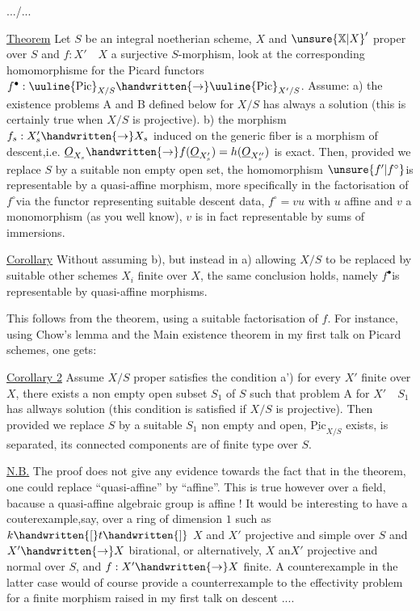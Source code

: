 \hfill .../...\par

\uline{Theorem} Let $S$ be an integral noetherian scheme, $X$ and $\unsure{\mathbb{X}|X}'$ proper over $S$ and $f:X'\quad X$ a surjective $S$-morphism, look at the corresponding homomorphisme for the Picard functors $f^{\bullet}:\text{\uuline{Pic}}_{X/S}\handwritten{\to}\text{\uuline{Pic}}_{X'/S}$. Assume: a) the existence problems A and B defined below for $X/S$ has always a solution (this is certainly true when $X/S$ is projective). b) the morphism $f_{s}:X'_{s}\handwritten{\to}X_{s}$ induced on the generic fiber is a morphism of descent,i.e. $\underline{O}_{X_{s}}\handwritten{\to}f(\underline{O}_{X'_{s}})=h(\underline{O}_{X''_{s}})$ is exact. Then, provided we replace $S$ by a suitable non empty open set, the homomorphism $\unsure{f'|f^{\circ}}$is representable by a quasi-affine morphism, more specifically \unsure{:|;} in the factorisation of $f^{\circ}$via the functor representing suitable descent data, $f^{\circ}=vu$ with $u$ affine and $v$ a monomorphism (as you well know), $v$ is in fact representable by   sums of immersions.

\uline{Corollary} Without assuming b), but instead in a) allowing $X/S$ to be replaced by suitable other schemes $X_{i}$ finite over $X$, the same conclusion  holds, namely $f^{\bullet}$is representable by quasi-affine morphisms.

This follows from the theorem, using a suitable factorisation of $f$. For instance, using Chow's lemma and the Main existence theorem in my first talk on Picard schemes, one gets:

\uline{Corollary 2} Assume $X/S$ proper satisfies the condition a') for every $X'$ finite over $X$, there exists a non empty open subset $S_{1}$ of $S$ such that problem A for $X'\quad S_{1}$ has allways solution  (this condition is satisfied if $X/S$ is projective). Then provided we replace $S$ by a suitable $S_{1}$ non empty and open, $\underline{\mathrm{Pic}}_{X/S}$ exists, is separated, its connected components are of finite type over $S$.

\uline{N.B.} The proof does not give any evidence towards the fact that in
the theorem, one could replace ``quasi-affine'' by ``affine''. This is true however over a field, bacause a quasi-affine algebraic group is affine ! It would be interesting to have a couterexample,say, over a ring of dimension $1$ such as $k\handwritten{[}t\handwritten{]}$\handwritten{,} $X$ and $X'$ projective and simple over $S$ and $X'\handwritten{\to}X$ birational, or alternatively, $X$ an$X'$ projective and normal over $S$, and $f:X'\handwritten{\to}X$ finite. A counterexample in the latter case would of course provide a counterrexample to the effectivity problem for a finite morphism raised in my first talk on descent ....

